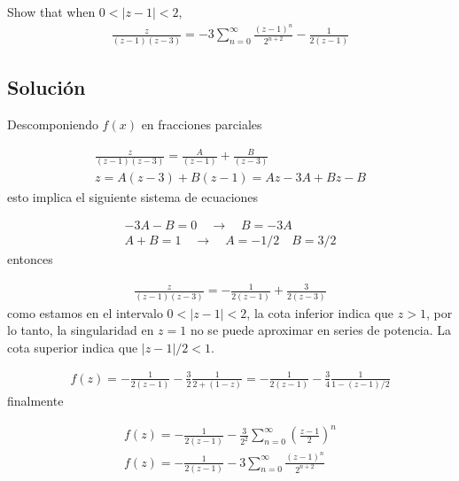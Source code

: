 \begin{problem}{5}
    Show that when $0 < |z - 1| < 2$,
    \begin{gather}
        \frac{z}{(z-1)(z-3)} = -3 \sum_{n = 0}^{\infty}\frac{(z-1)^n}{2^{n+2}} - \frac{1}{2(z-1)}
    \end{gather}
\end{problem}

\subsection*{Solución}
Descomponiendo $f(x)$ en fracciones parciales 

\begin{gather*}
    \frac{z}{(z-1)(z-3)} = \frac{A}{(z-1)} + \frac{B}{(z-3)}\\
    z = A(z-3) + B(z-1) = Az - 3A + Bz - B
\end{gather*}
esto implica el siguiente sistema de ecuaciones

\begin{gather*}
    -3A - B = 0 \quad \rightarrow \quad B = -3A\\
    A + B = 1   \quad \rightarrow \quad A = -1/2 \quad B = 3/2
\end{gather*}
entonces 

\begin{gather}
    \frac{z}{(z-1)(z-3)} = -\frac{1}{2(z-1)} + \frac{3}{2(z-3)}
\end{gather}
como estamos en el intervalo $0 < |z - 1| < 2$, la cota inferior indica que $ z > 1$, por lo tanto, la singularidad en $z=1$ no se puede aproximar en series de potencia. La cota superior indica que $|z-1|/2 < 1$.

\begin{gather*}
    f(z) = -\frac{1}{2(z-1)} - \frac{3}{2}\frac{1}{2 + (1-z)} = -\frac{1}{2(z-1)} - \frac{3}{4}\frac{1}{1 - (z-1)/2}
\end{gather*}
finalmente 

\begin{result}
    \begin{gather}
        f(z) = -\frac{1}{2(z-1)} - \frac{3}{2^2}\sum_{n = 0}^{\infty}\left(\frac{z-1}{2}\right)^n\\
        f(z) = -\frac{1}{2(z-1)} - 3\sum_{n = 0}^{\infty}\frac{(z-1)^n}{2^{n+2}}
    \end{gather}
\end{result}